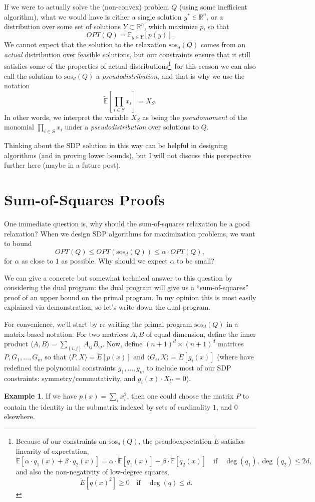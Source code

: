 \documentclass[a4paper,11pt]{article}
\newcommand{\R}{\mathbb{R}}
\newcommand{\E}{\mathbb{E}}
\newcommand{\sos}{\mathrm{sos}}
\theoremstyle{definition}
\newtheorem{example}{Example}
\begin{document}
If we were to actually solve the (non-convex) problem $Q$ (using some inefficient algorithm), what we would have is either a single solution $y^*\in \R^n$, or a distribution over some set of solutions $Y\subset \R^n$, which maximize $p$, so that
\[
OPT(Q) = \E_{y \in Y} [p(y)].
\]
We cannot expect that the solution to the relaxation $\sos_d(Q)$ comes from an {\em actual} distribution over feasible solutions, but our constraints ensure that it still satisfies some of the properties of actual distributions\footnote{
Because of our constraints on $\sos_d(Q)$, the pseudoexpectation $\tilde{E}$ satisfies linearity of expectation,
\[
\tilde{\E}[\alpha\cdot q_1(x) + \beta \cdot q_2(x)] = \alpha \cdot \tilde{\E}[q_1(x)] + \beta \cdot \tilde{\E}[q_2(x)]\quad \text{if} \quad \deg(q_1),\deg(q_2) \le 2d,
\]
and also the non-negativity of low-degree squares,
\[
\tilde{E}[q(x)^2] \ge 0 \quad \text{if} \quad \deg(q)\le d.
\]

}--for this reason we can also call the solution to $\sos_d(Q)$ a {\em pseudodistribution}, and that is why we use the notation
\[
\tilde{\E}\left[\prod_{i\in S} x_i \right] = X_S.
\]
In other words, we interpret the variable $X_S$ as being the {\em pseudomoment} of the monomial $\prod_{i\in S} x_i$ under a {\em pseudodistribution} over solutions to $Q$.

Thinking about the SDP solution in this way can be helpful in designing algorithms (and in proving lower bounds), but I will not discuss this perspective further here (maybe in a future post).


\section{Sum-of-Squares Proofs}

One immediate question is, why should the sum-of-squares relaxation be a good relaxation?
When we design SDP algorithms for maximization problems, we want to bound
\[
OPT(Q) \le OPT(\sos_d(Q)) \le \alpha \cdot OPT(Q),
\]
for $\alpha$ as close to $1$ as possible.
Why should we expect $\alpha$ to be small?

We can give a concrete but somewhat technical answer to this question by considering the dual program: the dual program will give us a ``sum-of-squares'' proof of an upper bound on the primal program.
In my opinion this is most easily explained via demonstration, so let's write down the dual program.

For convenience, we'll start by re-writing the primal program $\sos_d(Q)$ in a matrix-based notation.
For two matrices $A,B$ of equal dimension, define the inner product $\langle A,B \rangle = \sum_{(i,j)} A_{ij} B_{ij}$.
Now, define $(n+1)^d \times (n+1)^d$ matrices $P,G_1,\ldots,G_{m}$ so that $\langle P, X \rangle = \tilde{E}[p(x)]$ and $\langle G_i,X\rangle = \tilde{E}[g_i(x)]$ (where have redefined the polynomial constraints $g_1,\ldots,g_m$ to include most of our SDP constraints: symmetry/commutativity, and $g_i(x)\cdot X_U = 0$).
\begin{example}
If we have $p(x) = \sum_{i}x_i^2$, then one could choose the matrix $P$ to contain the identity in the submatrix indexed by sets of cardinality $1$, and $0$ elsewhere.
\end{example}
\end{document}
